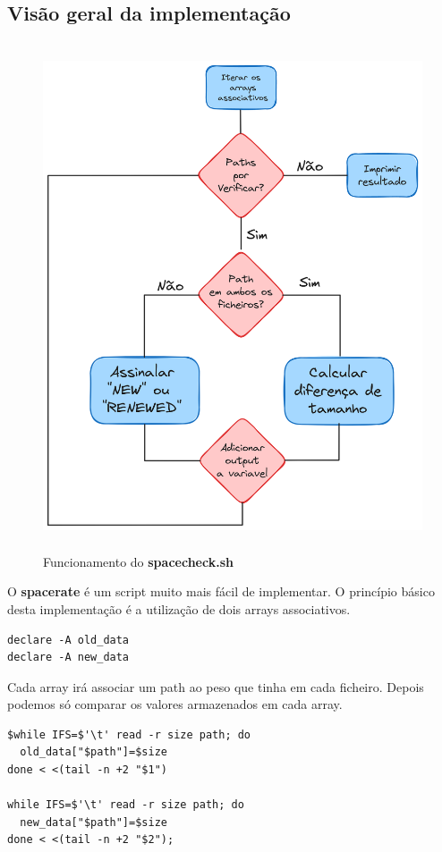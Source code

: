 \subsection{Visão geral da implementação}
\begin{figure}[H]
    \centering
    \includegraphics[height=15cm]{Fluxograma_Spacerate.png}
    \caption{Funcionamento do \textbf{spacecheck.sh}}
\end{figure}
O \textbf{spacerate} é um script muito mais fácil de
implementar. O princípio básico desta implementação é 
a utilização de dois arrays associativos. 
\begin{verbatim}
declare -A old_data
declare -A new_data
\end{verbatim}
Cada array irá associar um path ao peso que tinha em cada ficheiro.
Depois podemos só comparar os valores armazenados em cada
array.
\begin{verbatim}
$while IFS=$'\t' read -r size path; do
  old_data["$path"]=$size
done < <(tail -n +2 "$1") 

while IFS=$'\t' read -r size path; do
  new_data["$path"]=$size
done < <(tail -n +2 "$2");
\end{verbatim}
